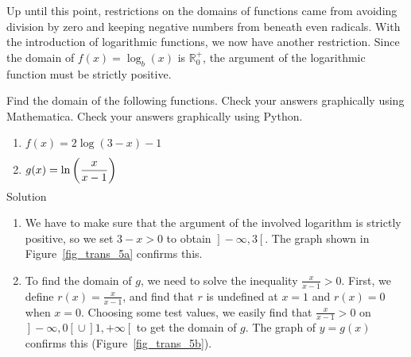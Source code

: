 \fi




Up until this point, restrictions on the domains of functions came from avoiding division by zero and keeping negative numbers from beneath even radicals.  With the introduction of logarithmic functions, we now have another restriction.  Since the domain of $f(x) = \log_{b}(x)$ is $\mathbb{R}_0^+$, the argument  of the logarithmic function must be strictly positive.  

\ifcalculus
\begin{example}  Find the domain of the following functions.
\ifcourse 
\ifmathematica
Check your answers graphically using Mathematica.
\fi
\ifpython
Check your answers graphically using Python.
\fi
\fi

\begin{multicols}{2}
\begin{enumerate}

\item  $f(x) = 2\log(3-x)-1$

\item  $g(x) = \ln \smash{\left(\dfrac{x}{x-1}\right)}$ %

\end{enumerate}
\end{multicols}

Solution 

\begin{enumerate}

\item  We have to make sure that the argument of the involved logarithm is strictly positive, so we set $3-x > 0$ to obtain  $\left.\right]-\infty, 3\left[\right.$.  The graph shown in Figure~\ref{fig_trans_5a} confirms this.  


\item  To find the domain of $g$, we need to solve the inequality $\frac{x}{x-1} > 0$. First, we define $r(x) = \frac{x}{x-1}$, and find that $r$ is undefined at $x=1$ and $r(x) = 0$ when $x=0$.  Choosing some test values, we easily find that $ \frac{x}{x-1} > 0$ on $\left.\right]-\infty, 0\left[\right. \cup \left.\right]1, +\infty\left[\right.$ to get the domain of $g$.  The graph of $y=g(x)$ confirms this (Figure~\ref{fig_trans_5b}). 


\end{enumerate}
\end{example}

